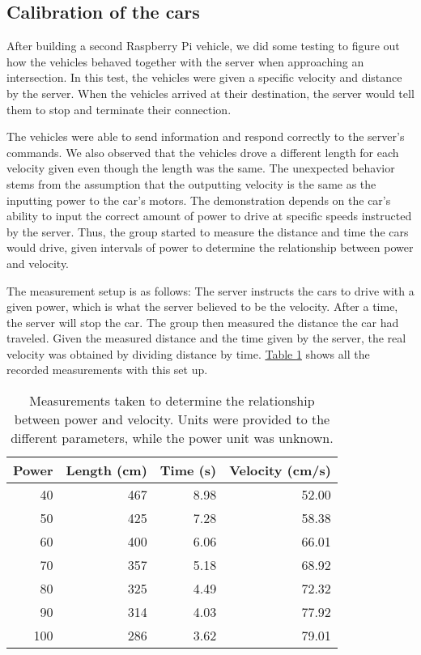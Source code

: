 \subsection{Calibration of the cars}
After building a second Raspberry Pi vehicle, we did some testing to figure out how the vehicles behaved together with the server when approaching an intersection. In this test, the vehicles were given a specific velocity and distance by the server. When the vehicles arrived at their destination, the server would tell them to stop and terminate their connection.

The vehicles were able to send information and respond correctly to the server's commands. We also observed that the vehicles drove a different length for each velocity given even though the length was the same. The unexpected behavior stems from the assumption that the outputting velocity is the same as the inputting power to the car's motors. The demonstration depends on the car's ability to input the correct amount of power to drive at specific speeds instructed by the server. Thus, the group started to measure the distance and time the cars would drive, given intervals of power to determine the relationship between power and velocity.

The measurement setup is as follows: The server instructs the cars to drive with a given power, which is what the server believed to be the velocity. After a time, the server will stop the car. The group then measured the distance the car had traveled. Given the measured distance and the time given by the server, the real velocity was obtained by dividing distance by time. \hyperref[tab:calibration]{Table \ref{tab:calibration}} shows all the recorded measurements with this set up.

\begin{table}[h!]
	\begin{center}
		\begin{tabular}{rrrr}
			\hline
			Power & Length (cm) & Time (s) & Velocity (cm/s) \\
			\hline
			40 & 467 & 8.98 & 52.00 \\
			50 & 425 & 7.28 & 58.38 \\
			60 & 400 & 6.06 & 66.01 \\
			70 & 357 & 5.18 & 68.92 \\
			80 & 325 & 4.49 & 72.32 \\
			90 & 314 & 4.03 & 77.92 \\
			100 & 286 & 3.62 & 79.01 \\
			\hline
		\end{tabular}
		\caption{Measurements taken to determine the relationship between power and velocity. Units were provided to the different parameters, while the power unit was unknown.}
		\label{tab:calibration}
	\end{center}
\end{table}

